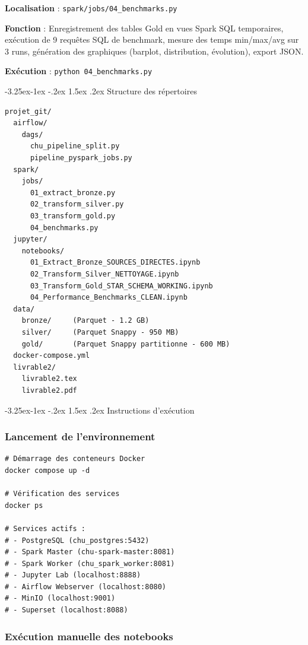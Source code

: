 \documentclass[12pt,a4paper]{article}
\makeatletter
\renewcommand\subsection{\@startsection{subsection}{2}{\z@}%
    {-3.25ex\@plus -1ex \@minus -.2ex}%
    {1.5ex \@plus .2ex}%
    {\normalfont\large\bfseries\color{blue!50!black}}}
\makeatother
\begin{document}
\textbf{Localisation} : \texttt{spark/jobs/04\_benchmarks.py}

\textbf{Fonction} : Enregistrement des tables Gold en vues Spark SQL temporaires, exécution de 9 requêtes SQL de benchmark, mesure des temps min/max/avg sur 3 runs, génération des graphiques (barplot, distribution, évolution), export JSON.

\textbf{Exécution} : \texttt{python 04\_benchmarks.py}

\subsection{Structure des répertoires}

\begin{verbatim}
projet_git/
  airflow/
    dags/
      chu_pipeline_split.py
      pipeline_pyspark_jobs.py
  spark/
    jobs/
      01_extract_bronze.py
      02_transform_silver.py
      03_transform_gold.py
      04_benchmarks.py
  jupyter/
    notebooks/
      01_Extract_Bronze_SOURCES_DIRECTES.ipynb
      02_Transform_Silver_NETTOYAGE.ipynb
      03_Transform_Gold_STAR_SCHEMA_WORKING.ipynb
      04_Performance_Benchmarks_CLEAN.ipynb
  data/
    bronze/     (Parquet - 1.2 GB)
    silver/     (Parquet Snappy - 950 MB)
    gold/       (Parquet Snappy partitionne - 600 MB)
  docker-compose.yml
  livrable2/
    livrable2.tex
    livrable2.pdf
\end{verbatim}

\subsection{Instructions d'exécution}

\subsubsection{Lancement de l'environnement}

\begin{verbatim}
# Démarrage des conteneurs Docker
docker compose up -d

# Vérification des services
docker ps

# Services actifs :
# - PostgreSQL (chu_postgres:5432)
# - Spark Master (chu-spark-master:8081)
# - Spark Worker (chu_spark_worker:8081)
# - Jupyter Lab (localhost:8888)
# - Airflow Webserver (localhost:8080)
# - MinIO (localhost:9001)
# - Superset (localhost:8088)
\end{verbatim}

\subsubsection{Exécution manuelle des notebooks}
\end{document}
